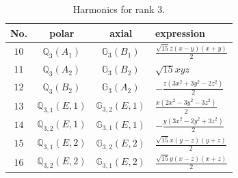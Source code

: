 \documentclass[fleqn,8pt,landscape]{jsarticle}
\begin{document}
\begin{table}[ht!]
\begin{center}
\caption{Harmonics for rank 3.}
\renewcommand{\arraystretch}{1.3}
\begin{tabular}{cccl} \hline \hline
No. & polar & axial & expression \\ \hline
$ 10 $ & $ \mathbb{Q}_{3}(A_{1}) $ & $ \mathbb{G}_{3}(B_{1}) $ & $ \frac{\sqrt{15} z \left(x - y\right) \left(x + y\right)}{2} $ \\
$ 11 $ & $ \mathbb{Q}_{3}(A_{2}) $ & $ \mathbb{G}_{3}(B_{2}) $ & $ \sqrt{15} x y z $ \\
$ 12 $ & $ \mathbb{Q}_{3}(B_{2}) $ & $ \mathbb{G}_{3}(A_{2}) $ & $ - \frac{z \left(3 x^{2} + 3 y^{2} - 2 z^{2}\right)}{2} $ \\
$ 13 $ & $ \mathbb{Q}_{3,1}(E,1) $ & $ \mathbb{G}_{3,2}(E,1) $ & $ \frac{x \left(2 x^{2} - 3 y^{2} - 3 z^{2}\right)}{2} $ \\
$ 14 $ & $ \mathbb{Q}_{3,2}(E,1) $ & $ \mathbb{G}_{3,1}(E,1) $ & $ - \frac{y \left(3 x^{2} - 2 y^{2} + 3 z^{2}\right)}{2} $ \\
$ 15 $ & $ \mathbb{Q}_{3,1}(E,2) $ & $ \mathbb{G}_{3,2}(E,2) $ & $ \frac{\sqrt{15} x \left(y - z\right) \left(y + z\right)}{2} $ \\
$ 16 $ & $ \mathbb{Q}_{3,2}(E,2) $ & $ \mathbb{G}_{3,1}(E,2) $ & $ \frac{\sqrt{15} y \left(x - z\right) \left(x + z\right)}{2} $ \\
 \hline \hline
\end{tabular}
\end{center}
\end{table}
\end{document}
